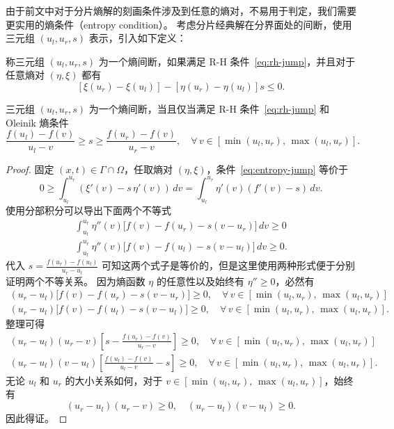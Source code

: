 由于前文中对于分片熵解的刻画条件涉及到任意的熵对，不易用于判定，我们需要更实用的熵条件（entropy condition）。
考虑分片经典解在分界面处的间断，使用三元组 $(u_l,u_r,s)$ 表示，引入如下定义：

\begin{definition}
    称三元组 $(u_l,u_r,s)$ 为一个熵间断，如果满足 R-H 条件~\eqref{eq:rh-jump}，并且对于任意熵对 $(\eta,\xi)$ 都有
    \[
        \left[\xi(u_r) - \xi(u_l)\right] - \left[\eta(u_r) - \eta(u_l)\right] s \le 0.
    \]
\end{definition}

\begin{theorem}[Oleinik]
    三元组 $(u_l,u_r,s)$ 为一个熵间断，当且仅当满足 R-H 条件~\eqref{eq:rh-jump} 和 Oleinik 熵条件
    \[
        \frac{f(u_l)-f(v)}{u_l-v} \ge s \ge \frac{f(u_r)-f(v)}{u_r-v},
        \quad \forall\,v \in [\min(u_l, u_r),\,\max(u_l, u_r)].
    \]
\end{theorem}

\begin{proof}
    固定 $(x,t) \in \Gamma \cap \Omega$，任取熵对 $(\eta,\xi)$，条件~\eqref{eq:entropy-jump} 等价于
    \[
        0 \ge{}  \int_{u_l}^{u_r} \left(\xi'(v) - s\, \eta'(v)\right) \,dv
        = \int_{u_l}^{u_r} \eta'(v) \left(f'(v) - s\right) \,dv.
    \]
    使用分部积分可以导出下面两个不等式
    \begin{gather*}
        \int_{u_l}^{u_r} \eta''(v) \big[ f(v) - f(u_r) - s(v - u_r) \big] \,dv \ge 0 \\
        \int_{u_l}^{u_r} \eta''(v) \big[ f(v) - f(u_l) - s(v - u_l) \big] \,dv \ge 0.
    \end{gather*}
    代入 $s = \frac{f(u_r)-f(u_l)}{u_r - u_l}$ 可知这两个式子是等价的，但是这里使用两种形式便于分别证明两个不等关系。
    因为熵函数 $\eta$ 的任意性以及始终有 $\eta'' \ge 0$，必然有
    \begin{gather*}
        (u_r - u_l) \big[ f(v) - f(u_r) - s(v - u_r) \big] \ge 0,\quad \forall\,v \in [\min(u_l, u_r),\,\max(u_l, u_r)] \\
        (u_r - u_l) \big[ f(v) - f(u_l) - s(v - u_l) \big] \ge 0,\quad \forall\,v \in [\min(u_l, u_r),\,\max(u_l, u_r)].
    \end{gather*}
    整理可得
    \begin{gather*}
        (u_r - u_l)(u_r - v) \left[ s - \frac{f(u_r)-f(v)}{u_r-v} \right] \ge 0,\quad \forall\,v \in [\min(u_l, u_r),\,\max(u_l, u_r)] \\
        (u_r - u_l)(v - u_l) \left[ \frac{f(u_l)-f(v)}{u_l-v} - s\right] \ge 0,\quad \forall\,v \in [\min(u_l, u_r),\,\max(u_l, u_r)].
    \end{gather*}
    无论 $u_l$ 和 $u_r$ 的大小关系如何，对于 $v \in [\min(u_l, u_r),\,\max(u_l, u_r)]$，始终有
    \[
        (u_r - u_l)(u_r - v) \ge 0, \quad (u_r - u_l)(v - u_l) \ge 0.
    \]
    因此得证。
\end{proof}

